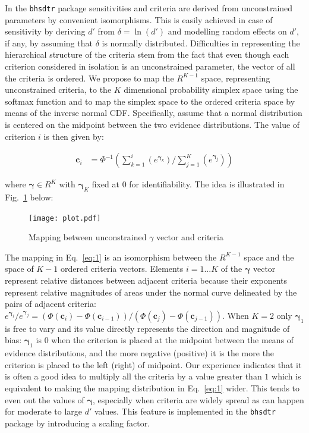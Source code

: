 \documentclass[oneside,a4paper]{article}
\begin{document}
In the \texttt{bhsdtr} package sensitivities and criteria are derived
from unconstrained parameters by convenient isomorphisms. This is
easily achieved in case of sensitivity by deriving $d'$ from
$\delta = \ln(d')$ and modelling random effects on $d'$, if any, by
assuming that $\delta$ is normally distributed. Difficulties in
representing the hierarchical structure of the criteria stem from the
fact that even though each criterion considered in isolation is an
unconstrained parameter, the vector of all the criteria is ordered.
We propose to map the $R^{K-1}$ space, representing unconstrained
criteria, to the $K$ dimensional probability simplex space using the
softmax function and to map the simplex space to the ordered criteria
space by means of the inverse normal CDF. Specifically, assume that a
normal distribution is centered on the midpoint between the two
evidence distributions. The value of criterion $i$ is then given by:

\begin{align}
  \bm{c}_i &= \Phi^{-1}(\sum_{k = 1}^i(e^{\bm{\gamma}_k}) / \sum_{j=1}^K(e^{\bm{\gamma}_j}))
\label{eq:1}
\end{align}

\noindent where $\bm{\gamma} \in R^K$ with $\bm{\gamma}_K$ fixed at
$0$ for identifiability. The idea is illustrated in
Fig.~\ref{fig:2} below:

\begin{figure}[H]
  \centering
  \texttt{[image: plot.pdf]}
  \caption{Mapping between unconstrained $\gamma$ vector and criteria}
  \label{fig:2}
\end{figure}

The mapping in Eq.~\ref{eq:1} is an isomorphism between the $R^{K-1}$
space and the space of $K-1$ ordered criteria vectors. Elements
$i = 1...K$ of the $\bm{\gamma}$ vector represent relative distances
between adjacent criteria because their exponents represent relative
magnitudes of areas under the normal curve delineated by the pairs of
adjacent criteria:
$e^{\bm{\gamma}_i} / e^{\bm{\gamma}_j} = (\Phi(\bm{c}_i) -
\Phi(\bm{c}_{i-1})) / (\Phi(\bm{c}_j) - \Phi(\bm{c}_{j-1}))$. When
$K=2$ only $\bm{\gamma}_1$ is free to vary and its value directly
represents the direction and magnitude of bias: $\bm{\gamma}_1$ is $0$
when the criterion is placed at the midpoint between the means of
evidence distributions, and the more negative (positive) it is the
more the criterion is placed to the left (right) of midpoint. Our
experience indicates that it is often a good idea to multiply all the
criteria by a value greater than $1$ which is equivalent to making the
mapping distribution in Eq.~\ref{eq:1} wider. This tends to even out
the values of $\bm{\gamma}$, especially when criteria are widely
spread as can happen for moderate to large $d'$ values. This feature
is implemented in the \texttt{bhsdtr} package by introducing a scaling
factor.
\end{document}
